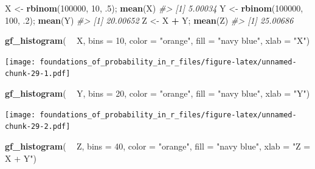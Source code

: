 \documentclass[]{article}
\newenvironment{Shaded}{\begin{snugshade}}{\end{snugshade}}
\newcommand{\CommentTok}[1]{\textcolor[rgb]{0.56,0.35,0.01}{\textit{#1}}}
\newcommand{\DataTypeTok}[1]{\textcolor[rgb]{0.13,0.29,0.53}{#1}}
\newcommand{\DecValTok}[1]{\textcolor[rgb]{0.00,0.00,0.81}{#1}}
\newcommand{\FloatTok}[1]{\textcolor[rgb]{0.00,0.00,0.81}{#1}}
\newcommand{\KeywordTok}[1]{\textcolor[rgb]{0.13,0.29,0.53}{\textbf{#1}}}
\newcommand{\NormalTok}[1]{#1}
\newcommand{\OperatorTok}[1]{\textcolor[rgb]{0.81,0.36,0.00}{\textbf{#1}}}
\newcommand{\StringTok}[1]{\textcolor[rgb]{0.31,0.60,0.02}{#1}}
\begin{document}
\begin{Shaded}
\begin{Highlighting}[]
\NormalTok{X <-}\StringTok{ }\KeywordTok{rbinom}\NormalTok{(}\DecValTok{100000}\NormalTok{, }\DecValTok{10}\NormalTok{, }\FloatTok{.5}\NormalTok{); }\KeywordTok{mean}\NormalTok{(X)}
\CommentTok{#> [1] 5.00034}
\NormalTok{Y <-}\StringTok{ }\KeywordTok{rbinom}\NormalTok{(}\DecValTok{100000}\NormalTok{, }\DecValTok{100}\NormalTok{, }\FloatTok{.2}\NormalTok{); }\KeywordTok{mean}\NormalTok{(Y)}
\CommentTok{#> [1] 20.00652}
\NormalTok{Z <-}\StringTok{ }\NormalTok{X }\OperatorTok{+}\StringTok{ }\NormalTok{Y; }\KeywordTok{mean}\NormalTok{(Z)}
\CommentTok{#> [1] 25.00686}

\KeywordTok{gf_histogram}\NormalTok{( }\OperatorTok{~}\StringTok{ }\NormalTok{X, }\DataTypeTok{bins =} \DecValTok{10}\NormalTok{, }
              \DataTypeTok{color =} \StringTok{"orange"}\NormalTok{, }
              \DataTypeTok{fill =} \StringTok{"navy blue"}\NormalTok{, }
              \DataTypeTok{xlab =} \StringTok{"X"}\NormalTok{)}
\end{Highlighting}
\end{Shaded}

\texttt{[image: foundations\_of\_probability\_in\_r\_files/figure-latex/unnamed-chunk-29-1.pdf]}

\begin{Shaded}
\begin{Highlighting}[]
\KeywordTok{gf_histogram}\NormalTok{( }\OperatorTok{~}\StringTok{ }\NormalTok{Y, }\DataTypeTok{bins =} \DecValTok{20}\NormalTok{, }
              \DataTypeTok{color =} \StringTok{"orange"}\NormalTok{, }
              \DataTypeTok{fill =} \StringTok{"navy blue"}\NormalTok{, }
              \DataTypeTok{xlab =} \StringTok{"Y"}\NormalTok{)}
\end{Highlighting}
\end{Shaded}

\texttt{[image: foundations\_of\_probability\_in\_r\_files/figure-latex/unnamed-chunk-29-2.pdf]}

\begin{Shaded}
\begin{Highlighting}[]
\KeywordTok{gf_histogram}\NormalTok{( }\OperatorTok{~}\StringTok{ }\NormalTok{Z, }\DataTypeTok{bins =} \DecValTok{40}\NormalTok{, }
              \DataTypeTok{color =} \StringTok{"orange"}\NormalTok{, }
              \DataTypeTok{fill =} \StringTok{"navy blue"}\NormalTok{, }
              \DataTypeTok{xlab =} \StringTok{"Z = X + Y"}\NormalTok{)}
\end{Highlighting}
\end{Shaded}
\end{document}
